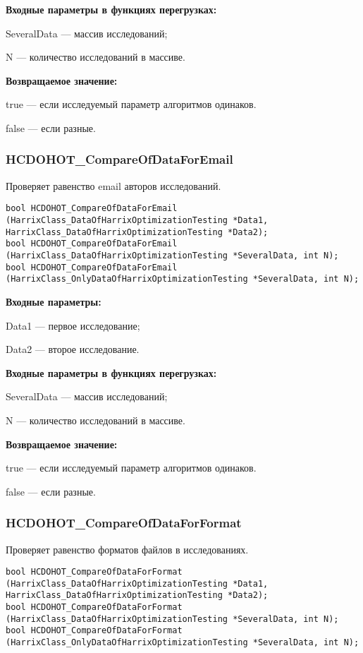 \documentclass[a4paper,12pt]{article}
\begin{document}
\textbf{Входные параметры в функциях перегрузках:}

SeveralData --- массив исследований;
 
N --- количество исследований в массиве.

\textbf{Возвращаемое значение:}

true --- если исследуемый параметр алгоритмов одинаков.
 
false --- если разные.


\subsubsection{HCDOHOT\_CompareOfDataForEmail}\label{HCDOHOT_CompareOfDataForEmail}

Проверяет равенство email авторов исследований.


\begin{lstlisting}[label=code_syntax_HCDOHOT_CompareOfDataForEmail,caption=Синтаксис]
bool HCDOHOT_CompareOfDataForEmail (HarrixClass_DataOfHarrixOptimizationTesting *Data1, HarrixClass_DataOfHarrixOptimizationTesting *Data2);
bool HCDOHOT_CompareOfDataForEmail (HarrixClass_DataOfHarrixOptimizationTesting *SeveralData, int N);
bool HCDOHOT_CompareOfDataForEmail (HarrixClass_OnlyDataOfHarrixOptimizationTesting *SeveralData, int N);
\end{lstlisting}

\textbf{Входные параметры:}

Data1 --- первое исследование;
 
Data2 --- второе исследование.
	 
\textbf{Входные параметры в функциях перегрузках:}

SeveralData --- массив исследований;
 
N --- количество исследований в массиве.

\textbf{Возвращаемое значение:}

true --- если исследуемый параметр алгоритмов одинаков.
 
false --- если разные.


\subsubsection{HCDOHOT\_CompareOfDataForFormat}\label{HCDOHOT_CompareOfDataForFormat}

Проверяет равенство форматов файлов в исследованиях.


\begin{lstlisting}[label=code_syntax_HCDOHOT_CompareOfDataForFormat,caption=Синтаксис]
bool HCDOHOT_CompareOfDataForFormat (HarrixClass_DataOfHarrixOptimizationTesting *Data1, HarrixClass_DataOfHarrixOptimizationTesting *Data2);
bool HCDOHOT_CompareOfDataForFormat (HarrixClass_DataOfHarrixOptimizationTesting *SeveralData, int N);
bool HCDOHOT_CompareOfDataForFormat (HarrixClass_OnlyDataOfHarrixOptimizationTesting *SeveralData, int N);
\end{lstlisting}
\end{document}
